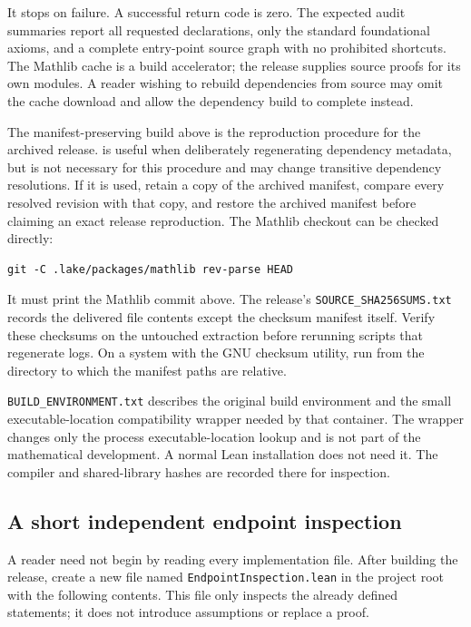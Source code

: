 It stops on failure.  A successful return code is zero.  The expected
audit summaries report all requested declarations, only the standard
foundational axioms, and a complete entry-point source graph with no
prohibited shortcuts.  The Mathlib cache is a build accelerator; the
release supplies source proofs for its own modules.  A reader wishing
to rebuild dependencies from source may omit the cache download and
allow the dependency build to complete instead.

The manifest-preserving build above is the reproduction procedure for
the archived release.  \texttt{} is useful when deliberately
regenerating dependency metadata, but is not necessary for this procedure
and may change transitive dependency resolutions.  If it is used, retain
a copy of the archived manifest, compare every resolved revision with
that copy, and restore the archived manifest before claiming an exact
release reproduction.  The Mathlib checkout can be checked directly:

\begingroup\small
\begin{verbatim}
git -C .lake/packages/mathlib rev-parse HEAD
\end{verbatim}
\endgroup

It must print the Mathlib commit above.  The release's
\nolinkurl{SOURCE_SHA256SUMS.txt} records the delivered file contents
except the checksum manifest itself.  Verify these checksums on the
untouched extraction before rerunning scripts that regenerate logs.
On a system with the GNU checksum utility, run
\texttt{} from the directory to which
the manifest paths are relative.

\nolinkurl{BUILD_ENVIRONMENT.txt} describes the original build environment
and the small executable-location compatibility wrapper needed by that
container.  The wrapper changes only the process executable-location
lookup and is not part of the mathematical development.  A normal Lean
installation does not need it.  The compiler and shared-library hashes
are recorded there for inspection.

\subsection{A short independent endpoint inspection}
\label{app:lean-smokecheck}

A reader need not begin by reading every implementation file.  After
building the release, create a new file named
\nolinkurl{EndpointInspection.lean} in the project root with the following
contents.  This file only inspects the already defined statements; it
does not introduce assumptions or replace a proof.

